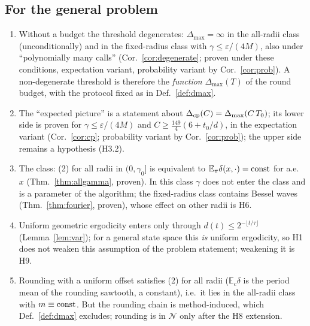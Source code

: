 \documentclass[11pt,a4paper]{article}
\numberwithin{equation}{section}
\theoremstyle{definition}
\theoremstyle{remark}
\newcommand{\E}{\mathbb E}\newcommand{\R}{\mathbb R}\newcommand{\N}{\mathbb N}\newcommand{\Prob}{\mathbb P}
\newcommand{\Dmax}{\Delta_{\max}}\newcommand{\Dcp}{\Delta_{\rm cp}}
\newcommand{\cN}{\mathcal N}\newcommand{\cG}{\mathcal G}\newcommand{\cF}{\mathcal F}\newcommand{\cS}{\mathcal S}
\begin{document}
\subsection{For the general problem}
\begin{enumerate}
\item Without a budget the threshold degenerates: $\Dmax=\infty$ in the all-radii class (unconditionally) and in the fixed-radius class with $\gamma\le\varepsilon/(4M)$, also under ``polynomially many calls'' (Cor.~\ref{cor:degenerate}; proven under these conditions, expectation variant, probability variant by Cor.~\ref{cor:prob}). A non-degenerate threshold is therefore the \emph{function} $\Dmax(T)$ of the round budget, with the protocol fixed as in Def.~\ref{def:dmax}.
\item The ``expected picture'' is a statement about $\Dcp(C)=\Dmax(C\,T_0)$; its lower side is proven for $\gamma\le\varepsilon/(4M)$ and $C\ge\frac{149}4(6+t_0/d)$, in the expectation variant (Cor.~\ref{cor:cp}; probability variant by Cor.~\ref{cor:prob}); the upper side remains a hypothesis (H3.2).
\item The class: (2) for all radii in $(0,\gamma_0]$ is equivalent to $\E_\pi\delta(x,\cdot)={\rm const}$ for a.e.\ $x$ (Thm.~\ref{thm:allgamma}, proven). In this class $\gamma$ does not enter the class and is a parameter of the algorithm; the fixed-radius class contains Bessel waves (Thm.~\ref{thm:fourier}, proven), whose effect on other radii is H6.
\item Uniform geometric ergodicity enters only through $d(t)\le2^{-\lfloor t/\tau\rfloor}$ (Lemma~\ref{lem:var}); for a general state space this \emph{is} uniform ergodicity, so H1 does not weaken this assumption of the problem statement; weakening it is H9.
\item Rounding with a uniform offset satisfies (2) for all radii ($\E_c\delta$ is the period mean of the rounding sawtooth, a constant), i.e.\ it lies in the all-radii class with $m\equiv{\rm const}$. But the rounding chain is method-induced, which Def.~\ref{def:dmax} excludes; rounding is in $\cN$ only after the H8 extension.
\end{enumerate}
\end{document}
